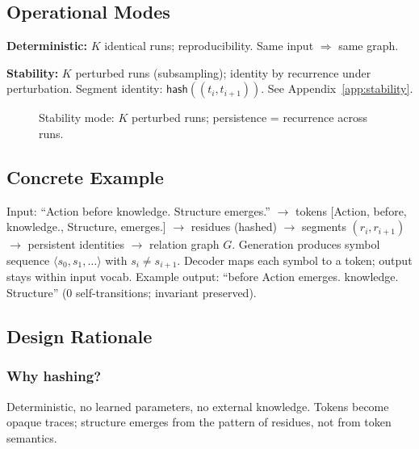 \documentclass[10pt]{article}
\begin{document}
\subsection{Operational Modes}

\textbf{Deterministic:} $K$ identical runs; reproducibility. Same input $\Rightarrow$ same graph.

\textbf{Stability:} $K$ perturbed runs (subsampling); identity by recurrence under perturbation. Segment identity: $\mathsf{hash}((t_i, t_{i+1}))$. See Appendix~\ref{app:stability}.

\begin{figure}[t]
\centering
{}
\caption{Stability mode: $K$ perturbed runs; persistence = recurrence across runs.}
\label{fig:stability}
\end{figure}

\subsection{Concrete Example}

Input: ``Action before knowledge. Structure emerges.'' $\rightarrow$ tokens [Action, before, knowledge., Structure, emerges.] $\rightarrow$ residues (hashed) $\rightarrow$ segments $(r_i, r_{i+1})$ $\rightarrow$ persistent identities $\rightarrow$ relation graph $G$. Generation produces symbol sequence $\langle s_0, s_1, \ldots \rangle$ with $s_i \neq s_{i+1}$. Decoder maps each symbol to a token; output stays within input vocab. Example output: ``before Action emerges. knowledge. Structure'' (0 self-transitions; invariant preserved).

\subsection{Design Rationale}

\subsubsection{Why hashing?} Deterministic, no learned parameters, no external knowledge. Tokens become opaque traces; structure emerges from the pattern of residues, not from token semantics.
\end{document}
